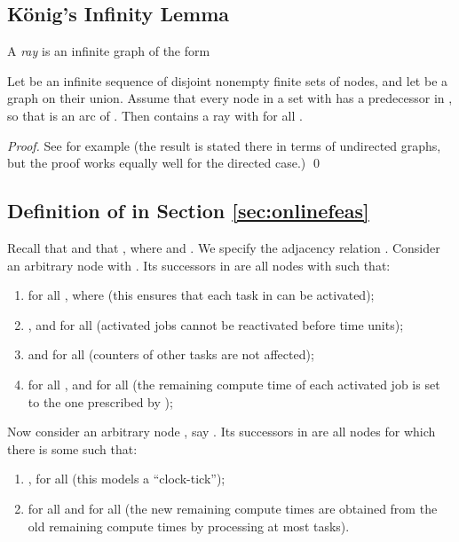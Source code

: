 \documentclass{llncs}
\begin{document}
\subsection{K\"onig's Infinity Lemma}


A \emph{ray} is an infinite graph  of the form



\begin{koenig}
Let	 be an infinite sequence of disjoint nonempty finite sets of nodes, and let  be a graph on their union. Assume that every node  in a set  with  has a predecessor  in , so that  is an arc of . Then  contains a ray  with  for all . 
\end{koenig}
\begin{proof}
See for example \cite[Lemma 8.1.2]{Diestel:2005} (the result is stated there in terms of undirected graphs, but the proof works equally well for the directed case.)  
\qed
\end{proof}

\subsection{Definition of  in Section \ref{sec:onlinefeas}}
Recall that  and that , where  and . 
We specify the adjacency relation . Consider an arbitrary node  with . Its successors in  are all nodes  with  such that: 
\begin{enumerate}
\item  for all , where  (this ensures that each task in  can be activated); 
\item , and  for all  (activated jobs cannot be reactivated before  time units); 
\item  and  for all  (counters of other tasks are not affected); 
\item  for all , and  for all  (the remaining compute time of each activated job is set to the one prescribed by );    
\end{enumerate}
Now consider an arbitrary node , say . Its successors in  are all nodes  for which there is some  such that: 
\begin{enumerate}
\item ,  for all  (this models a ``clock-tick''); 
\item  for all  and  for all  (the new remaining compute times are obtained from the old remaining compute times by processing at most  tasks). 
\end{enumerate}
\end{document}
